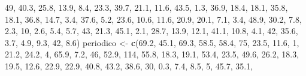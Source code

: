 \documentclass[]{book}
\newenvironment{Shaded}{\begin{snugshade}}{\end{snugshade}}
\newcommand{\KeywordTok}[1]{\textcolor[rgb]{0.13,0.29,0.53}{\textbf{#1}}}
\newcommand{\DecValTok}[1]{\textcolor[rgb]{0.00,0.00,0.81}{#1}}
\newcommand{\FloatTok}[1]{\textcolor[rgb]{0.00,0.00,0.81}{#1}}
\newcommand{\StringTok}[1]{\textcolor[rgb]{0.31,0.60,0.02}{#1}}
\newcommand{\NormalTok}[1]{#1}
\begin{document}
\begin{Shaded}
\begin{Highlighting}[]
    \DecValTok{49}\NormalTok{, }\FloatTok{40.3}\NormalTok{, }\FloatTok{25.8}\NormalTok{, }\FloatTok{13.9}\NormalTok{, }\FloatTok{8.4}\NormalTok{, }\FloatTok{23.3}\NormalTok{, }\FloatTok{39.7}\NormalTok{, }\FloatTok{21.1}\NormalTok{, }\FloatTok{11.6}\NormalTok{, }\FloatTok{43.5}\NormalTok{, }\FloatTok{1.3}\NormalTok{, }\FloatTok{36.9}\NormalTok{, }\FloatTok{18.4}\NormalTok{, }
    \FloatTok{18.1}\NormalTok{, }\FloatTok{35.8}\NormalTok{, }\FloatTok{18.1}\NormalTok{, }\FloatTok{36.8}\NormalTok{, }\FloatTok{14.7}\NormalTok{, }\FloatTok{3.4}\NormalTok{, }\FloatTok{37.6}\NormalTok{, }\FloatTok{5.2}\NormalTok{, }\FloatTok{23.6}\NormalTok{, }\FloatTok{10.6}\NormalTok{, }\FloatTok{11.6}\NormalTok{, }\FloatTok{20.9}\NormalTok{, }\FloatTok{20.1}\NormalTok{, }
    \FloatTok{7.1}\NormalTok{, }\FloatTok{3.4}\NormalTok{, }\FloatTok{48.9}\NormalTok{, }\FloatTok{30.2}\NormalTok{, }\FloatTok{7.8}\NormalTok{, }\FloatTok{2.3}\NormalTok{, }\DecValTok{10}\NormalTok{, }\FloatTok{2.6}\NormalTok{, }\FloatTok{5.4}\NormalTok{, }\FloatTok{5.7}\NormalTok{, }\DecValTok{43}\NormalTok{, }\FloatTok{21.3}\NormalTok{, }\FloatTok{45.1}\NormalTok{, }\FloatTok{2.1}\NormalTok{, }
    \FloatTok{28.7}\NormalTok{, }\FloatTok{13.9}\NormalTok{, }\FloatTok{12.1}\NormalTok{, }\FloatTok{41.1}\NormalTok{, }\FloatTok{10.8}\NormalTok{, }\FloatTok{4.1}\NormalTok{, }\DecValTok{42}\NormalTok{, }\FloatTok{35.6}\NormalTok{, }\FloatTok{3.7}\NormalTok{, }\FloatTok{4.9}\NormalTok{, }\FloatTok{9.3}\NormalTok{, }\DecValTok{42}\NormalTok{, }\FloatTok{8.6}\NormalTok{)}
\NormalTok{periodico <-}\StringTok{ }\KeywordTok{c}\NormalTok{(}\FloatTok{69.2}\NormalTok{, }\FloatTok{45.1}\NormalTok{, }\FloatTok{69.3}\NormalTok{, }\FloatTok{58.5}\NormalTok{, }\FloatTok{58.4}\NormalTok{, }\DecValTok{75}\NormalTok{, }\FloatTok{23.5}\NormalTok{, }\FloatTok{11.6}\NormalTok{, }\DecValTok{1}\NormalTok{, }\FloatTok{21.2}\NormalTok{, }\FloatTok{24.2}\NormalTok{, }
    \DecValTok{4}\NormalTok{, }\FloatTok{65.9}\NormalTok{, }\FloatTok{7.2}\NormalTok{, }\DecValTok{46}\NormalTok{, }\FloatTok{52.9}\NormalTok{, }\DecValTok{114}\NormalTok{, }\FloatTok{55.8}\NormalTok{, }\FloatTok{18.3}\NormalTok{, }\FloatTok{19.1}\NormalTok{, }\FloatTok{53.4}\NormalTok{, }\FloatTok{23.5}\NormalTok{, }\FloatTok{49.6}\NormalTok{, }\FloatTok{26.2}\NormalTok{, }\FloatTok{18.3}\NormalTok{, }
    \FloatTok{19.5}\NormalTok{, }\FloatTok{12.6}\NormalTok{, }\FloatTok{22.9}\NormalTok{, }\FloatTok{22.9}\NormalTok{, }\FloatTok{40.8}\NormalTok{, }\FloatTok{43.2}\NormalTok{, }\FloatTok{38.6}\NormalTok{, }\DecValTok{30}\NormalTok{, }\FloatTok{0.3}\NormalTok{, }\FloatTok{7.4}\NormalTok{, }\FloatTok{8.5}\NormalTok{, }\DecValTok{5}\NormalTok{, }\FloatTok{45.7}\NormalTok{, }\FloatTok{35.1}\NormalTok{, }

\end{Highlighting}
\end{Shaded}
\end{document}
